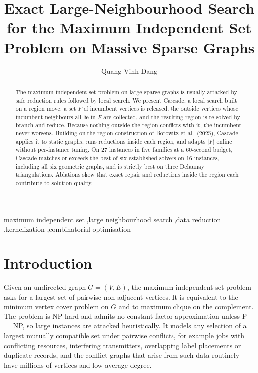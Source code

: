 \documentclass[review,authoryear,11pt]{elsarticle}
\theoremstyle{definition}
\begin{document}
\begin{frontmatter}

\title{Exact Large-Neighbourhood Search for the Maximum Independent Set
       Problem on Massive Sparse Graphs}

\author[buv]{Quang-Vinh Dang}

\begin{abstract}
The maximum independent set problem on large sparse graphs is usually attacked
by safe reduction rules followed by local search. We present Cascade, a local
search built on a region move: a set $F$ of incumbent vertices is released, the
outside vertices whose incumbent neighbours all lie in $F$ are collected, and the
resulting region is re-solved by branch-and-reduce. Because nothing outside the
region conflicts with it, the incumbent never worsens. Building on the region
construction of Borowitz et al.\ (2025), Cascade applies it to static graphs,
runs reductions inside each region, and adapts $|F|$ online without per-instance
tuning. On 27 instances in five families at a 60-second budget, Cascade matches
or exceeds the best of six established solvers on 16 instances, including all
six geometric graphs, and is strictly best on three Delaunay triangulations.
Ablations show that exact repair and reductions inside the region each
contribute to solution quality.
\end{abstract}


\begin{keyword}
maximum independent set \sep large neighbourhood search \sep data reduction
\sep kernelization \sep combinatorial optimisation
\end{keyword}

\end{frontmatter}

\section{Introduction}
\label{sec:intro}

Given an undirected graph $G=(V,E)$, the maximum independent set problem asks
for a largest set of pairwise non-adjacent vertices. It is equivalent to the
minimum vertex cover problem on $G$ and to maximum clique on the complement.
The problem is NP-hard and admits no constant-factor approximation unless
P${}={}$NP, so large instances are attacked heuristically. It models any
selection of a largest mutually compatible set under pairwise conflicts, for
example jobs with conflicting resources, interfering transmitters, overlapping
label placements or duplicate records, and the conflict graphs that arise from
such data routinely have millions of vertices and low average degree.
\end{document}
